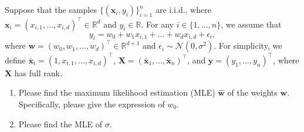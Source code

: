 \documentclass[11pt,letter,notitlepage]{article}
\begin{document}
\begin{exercise}\label{Exe5}
    Suppose that the samples $\{(\mathbf{x}_i,y_i)\}^n_{i=1}$ are i.i.d., where $\mathbf{x}_i =(x_{i,1}, \dots, x_{i,d})^{\top} \in \mathbb{R}^d$  and $y_i \in \mathbb{R}$. For any $i\in \{1,\dots, n\}$, we assume that
    $$y_i =  w_0 + w_1 x_{i,1} +\dots + w_d x_{i,d} + \epsilon_i,$$
    where $\mathbf{w} = (w_0,w_1,\dots,w_d)^{\top}\in \mathbb{R}^{d+1}$ and $\epsilon_i\sim \mathcal{N}(0,\sigma^2)$. For simplicity, we define $\bar{\mathbf{x}}_i = (1, x_{i,1}, \dots, x_{i,d})^\top$, $ \mathbf{X}=(\bar{\mathbf{x}}_1,\dots,\bar{\mathbf{x}}_n)^\top$, and $\mathbf{y}=(y_1,\dots,y_n)^\top$, where $\mathbf{X}$ has full rank.
    \begin{enumerate}
        \item Please find the maximum likelihood estimation (MLE) $\hat{\mathbf{w}}$ of the weights $\mathbf{w}$. Specifically, please give the expression of $w_0$.
        \item Please find the MLE of $\sigma$.
    \end{enumerate}
\end{exercise}
\end{document}
